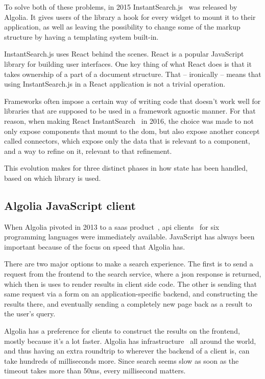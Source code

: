 To solve both of these problems, in 2015 InstantSearch.js~\cite{instantsearch-js} was released by Algolia. It gives users of the \gls{library} a hook for every widget to mount it to their application, as well as leaving the possibility to change some of the markup structure by having a templating system built-in.

InstantSearch.js uses React behind the scenes. React\cite{react-doc} is a popular JavaScript \gls{library} for building user interfaces. One key thing of what React does is that it takes ownership of a part of a document structure. That -- ironically -- means that using InstantSearch.js in a React application is not a trivial operation.

Frameworks often impose a certain way of writing code that doesn't work well for libraries that are supposed to be used in a framework agnostic manner. For that reason, when making React InstantSearch~\cite{react-instantsearch} in 2016, the choice was made to not only expose components that mount to the \acrshort{dom}, but also expose another concept called connectors, which expose only the data that is relevant to a component, and a way to refine on it, relevant to that refinement.

This evolution makes for three distinct phases in how state has been handled, based on which \gls{library} is used.


\subsection{Algolia JavaScript client} %
\label{sub:algolia_js_client}

When Algolia pivoted in 2013 to a \acrshort{saas} product~\cite{algolia-blog-saas}, \acrshort{api} clients~\cite{algolia-blog-lauch} for six programming languages were immediately available. JavaScript has always been important because of the focus on speed that Algolia has.

There are two major options to make a search experience. The first is to send a request from the frontend to the search service, where a \acrshort{json} response is returned, which then is uses to render results in client side code. The other is sending that same request via a form on an application-specific backend, and constructing the results there, and eventually sending a completely new page back as a result to the user's query.

Algolia has a preference for clients to construct the results on the frontend, mostly because it's a lot faster. Algolia has infrastructure~\cite{algolia-infra} all around the world, and thus having an extra roundtrip to wherever the backend of a client is, can take hundreds of milliseconds more. Since search seems slow as soon as the timeout takes more than 50ms, every millisecond matters.

